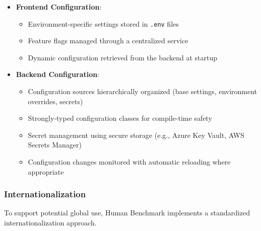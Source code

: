 \begin{itemize}
    \item \textbf{Frontend Configuration}:
    \begin{itemize}
        \item Environment-specific settings stored in \texttt{.env} files
        \item Feature flags managed through a centralized service
        \item Dynamic configuration retrieved from the backend at startup
    \end{itemize}
    
    \item \textbf{Backend Configuration}:
    \begin{itemize}
        \item Configuration sources hierarchically organized (base settings, environment overrides, secrets)
        \item Strongly-typed configuration classes for compile-time safety
        \item Secret management using secure storage (e.g., Azure Key Vault, AWS Secrets Manager)
        \item Configuration changes monitored with automatic reloading where appropriate
    \end{itemize}
\end{itemize}

\subsubsection{Internationalization}

To support potential global use, Human Benchmark implements a standardized internationalization approach.

